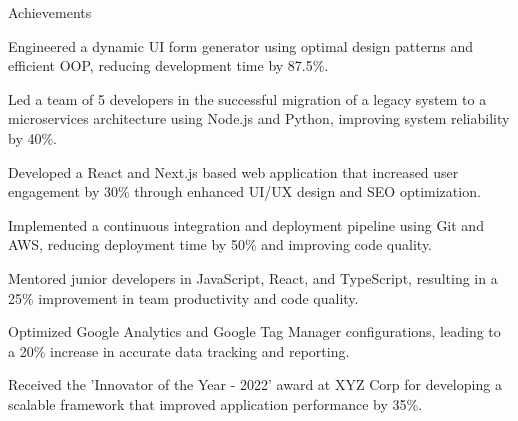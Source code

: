 \documentclass{resume} %
\begin{document}
    \begin{rSection}{Achievements}
        \begin{rSubsection}{}{}{}
                            \item Engineered a dynamic UI form generator using optimal design patterns and efficient OOP, reducing development time by 87.5\%.
                            \item Led a team of 5 developers in the successful migration of a legacy system to a microservices architecture using Node.js and Python, improving system reliability by 40\%.
                            \item Developed a React and Next.js based web application that increased user engagement by 30\% through enhanced UI/UX design and SEO optimization.
                            \item Implemented a continuous integration and deployment pipeline using Git and AWS, reducing deployment time by 50\% and improving code quality.
                            \item Mentored junior developers in JavaScript, React, and TypeScript, resulting in a 25\% improvement in team productivity and code quality.
                            \item Optimized Google Analytics and Google Tag Manager configurations, leading to a 20\% increase in accurate data tracking and reporting.
                            \item Received the 'Innovator of the Year {-} 2022' award at XYZ Corp for developing a scalable framework that improved application performance by 35\%.
                    \end{rSubsection}
    \end{rSection}
\end{document}
